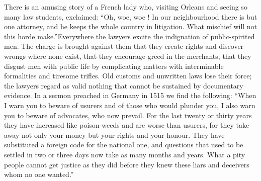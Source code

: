 \documentclass{book}
\begin{document}
There is an amusing story of a French lady who, visiting Orleans and seeing so many law students, exclaimed: “Oh, woe, woe ! In our neighbourhood there is but one attorney, and he keeps the whole country in litigation. What mischief will not this horde make.”\footnotemark[9] Everywhere the lawyers excite the indignation of public-spirited men. The charge is brought against them that they create rights and discover wrongs where none exist, that they encourage greed in the merchants, that they disgust men with public life by complicating matters with interminable formalities and tiresome trifles. Old customs and unwritten laws lose their force; the lawyers regard as valid nothing that cannot be sustained by documentary evidence. In a sermon preached in Germany in 1515 we find the following: “When I warn you to beware of usurers and of those who would plunder you, I also warn you to beware of advocates, who now prevail. For the last twenty or thirty years they have increased like poison-weeds and are worse than usurers, for they take away not only your money but your rights and your honour. They have substituted a foreign code for the national one, and questions that used to be settled in two or three days now take as many months and years. What a pity people cannot get justice as they did before they knew these liars and deceivers whom no one wanted.”\footnotemark[10]
\end{document}
